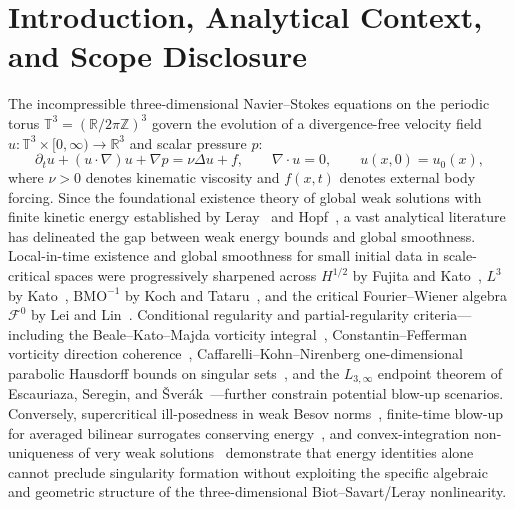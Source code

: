 \documentclass[11pt]{article}
\theoremstyle{plain}
\theoremstyle{definition}
\begin{document}
\begin{abstract}
certifying scale-separated bimodal flows ($m_2 > 4 m_1$, up to $1{,}000\,\nu$), and singularity-free polar $(\Omega,\xi)$ palinstrophy splitting $P = P_{\mathrm{amp}} + P_{\mathrm{dir}}$ ($26.47\times$--$28.56\times$ ceiling widening), zero-gap four-channel Bony paraproduct UV barriers certifying supercritical 10-octave and 23-shell gapless cascades ($m_{j+1} \le 2 m_j$), and $C^{1/2}$ direction-cone $D^3 \to D^2$ Leray window-doubling closure. Explicit scope disclosures isolating unconditional $\nu \to 0^+$ cone integrability on the single $\mathbb{S}^2$ vorticity-direction PDE accompany our open-source verification artifacts (\texttt{doi:10.5281/zenodo.23873219}).
\end{abstract}

\section{Introduction, Analytical Context, and Scope Disclosure}\label{sec:intro}

The incompressible three-dimensional Navier--Stokes equations on the periodic torus $\mathbb{T}^3 = (\mathbb{R}/2\pi\mathbb{Z})^3$ govern the evolution of a divergence-free velocity field $u : \mathbb{T}^3 \times [0,\infty) \to \mathbb{R}^3$ and scalar pressure $p$:
\begin{equation}\label{eq:ns}
  \partial_t u + (u \cdot \nabla) u + \nabla p = \nu \Delta u + f, \qquad \nabla \cdot u = 0, \qquad u(x,0) = u_0(x),
\end{equation}
where $\nu > 0$ denotes kinematic viscosity and $f(x,t)$ denotes external body forcing. Since the foundational existence theory of global weak solutions with finite kinetic energy established by Leray~\cite{leray1934} and Hopf~\cite{hopf1951}, a vast analytical literature has delineated the gap between weak energy bounds and global smoothness. Local-in-time existence and global smoothness for small initial data in scale-critical spaces were progressively sharpened across $H^{1/2}$ by Fujita and Kato~\cite{fujitakato1964}, $L^3$ by Kato~\cite{kato1984}, $\mathrm{BMO}^{-1}$ by Koch and Tataru~\cite{kochtataru2001}, and the critical Fourier--Wiener algebra $\mathcal{F}^0$ by Lei and Lin~\cite{leilin2011}. Conditional regularity and partial-regularity criteria---including the Beale--Kato--Majda vorticity integral~\cite{bkm1984}, Constantin--Fefferman vorticity direction coherence~\cite{cf1993}, Caffarelli--Kohn--Nirenberg one-dimensional parabolic Hausdorff bounds on singular sets~\cite{ckn1982}, and the $L_{3,\infty}$ endpoint theorem of Escauriaza, Seregin, and \v{S}ver\'ak~\cite{ess2003}---further constrain potential blow-up scenarios. Conversely, supercritical ill-posedness in weak Besov norms~\cite{cheskidov2010}, finite-time blow-up for averaged bilinear surrogates conserving energy~\cite{tao2016}, and convex-integration non-uniqueness of very weak solutions~\cite{buckmastervicol2019} demonstrate that energy identities alone cannot preclude singularity formation without exploiting the specific algebraic and geometric structure of the three-dimensional Biot--Savart/Leray nonlinearity.
\end{document}
